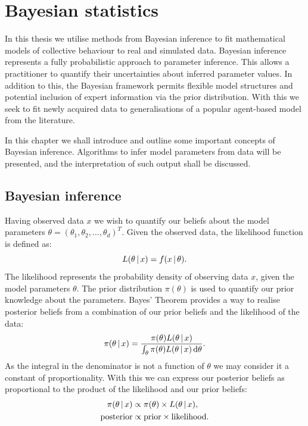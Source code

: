 \graphicspath{{fig/bayes_intro/}}

\chapter{Bayesian statistics}
\label{cha:bayes_intro}

In this thesis we utilise methods from Bayesian inference to fit mathematical
models of collective behaviour to real and simulated data. Bayesian inference
represents a fully probabilistic approach to parameter inference. This allows a
practitioner to quantify their uncertainties about inferred parameter values.
In addition to this, the Bayesian framework permits flexible model structures
and potential inclusion of expert information via the prior distribution. With
this we seek to fit newly acquired data to generalisations of a popular
agent-based model from the literature.

In this chapter we shall introduce and outline some important concepts of
Bayesian inference. Algorithms to infer model parameters from data will be
presented, and the interpretation of such output shall be discussed.

\section{Bayesian inference}
\label{sec:bayesian_inference}

Having observed data $x$ we wish to quantify our beliefs about the model
parameters $\theta = (\theta_1,\theta_2,\dots,\theta_d)^T$. Given the observed
data, the likelihood function is defined as:
\begin{equation}
  L(\theta \,|\, x) = f(x \,|\,\theta).
\end{equation}
The likelihood represents the probability density of observing data $x$, given
the model parameters $\theta$. The prior distribution $\pi(\theta)$ is used to
quantify our prior knowledge about the parameters. Bayes' Theorem provides a
way to realise posterior beliefs from a combination of our prior beliefs and
the likelihood of the data:
\begin{equation}
  \label{eq:bayes_theorem}
  \pi(\theta \given x) =
    \frac{\pi(\theta) L(\theta\given x)}%
         {\int_{\theta} \pi(\theta) L(\theta\given x) \, \textup{d}\theta}.
\end{equation}
As the integral in the denominator is not a function of $\theta$ we may
consider it a constant of proportionality. With this we can express our
posterior beliefs as proportional to the product of the likelihood and our
prior beliefs:
\begin{align*}
  \pi(\theta\,|\, x) & \propto \pi(\theta) \times L(\theta\,|\, x), \\
  \text{posterior}    & \propto \text{prior} \times \text{likelihood}.
\end{align*}

